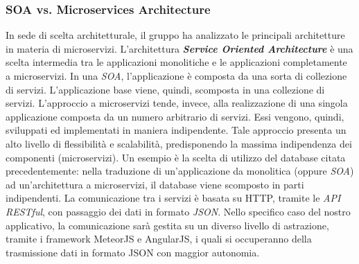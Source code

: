 \subsubsection{SOA vs. Microservices Architecture}
In sede di scelta architetturale, il gruppo \textit{\gruppo} ha analizzato le principali architetture in materia di microservizi. L'architettura \textbf{\textit{Service Oriented Architecture}} è una scelta intermedia tra le applicazioni monolitiche e le applicazioni completamente a microservizi. In una \textit{SOA}, l'applicazione è composta da una sorta di collezione di servizi. L'applicazione base viene, quindi, scomposta in una collezione di servizi. L'approccio a microservizi tende, invece, alla realizzazione di una singola applicazione composta da un numero arbitrario di servizi. Essi vengono, quindi, sviluppati ed implementati in maniera indipendente. Tale approccio presenta un alto livello di flessibilità e scalabilità, predisponendo la massima indipendenza dei componenti (microservizi). Un esempio è la scelta di utilizzo del database citata precedentemente: nella traduzione di un'applicazione da monolitica (oppure \textit{SOA}) ad un'architettura a microservizi, il database viene scomposto in parti indipendenti. La comunicazione tra i servizi è basata su HTTP, tramite le \textit{API RESTful}, con passaggio dei dati in formato \textit{JSON}. Nello specifico caso del nostro applicativo, la comunicazione sarà gestita su un diverso livello di astrazione, tramite i framework MeteorJS e AngularJS, i quali si occuperanno della trasmissione dati in formato JSON con maggior autonomia.
